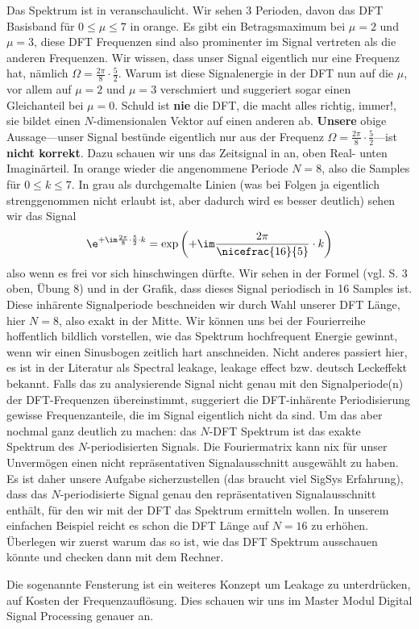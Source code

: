 \begin{Loesung}
%
%
Das Spektrum ist in  veranschaulicht. Wir sehen
3 Perioden, davon das DFT Basisband für $0\leq \mu \leq 7$ in orange.
Es gibt ein Betragsmaximum bei $\mu=2$ und $\mu=3$, diese DFT Frequenzen sind
also prominenter im Signal vertreten als die anderen Frequenzen.
%
Wir wissen, dass unser Signal eigentlich nur eine Frequenz hat, nämlich
$\Omega=\frac{2\pi}{8}\cdot\frac{5}{2}$.
Warum ist diese Signalenergie in der DFT nun auf die $\mu$, vor allem auf $\mu=2$ und
$\mu=3$  verschmiert und suggeriert sogar einen Gleichanteil bei $\mu=0$.
%
Schuld ist \textbf{nie} die DFT, die macht alles richtig, immer!, sie bildet
einen $N$-dimensionalen Vektor auf einen anderen ab.
%
\textbf{Unsere} obige Aussage---unser Signal bestünde eigentlich nur aus der Frequenz
$\Omega=\frac{2\pi}{8}\cdot\frac{5}{2}$---ist \textbf{nicht korrekt}.
Dazu schauen wir uns das Zeitsignal in  an, oben
Real- unten Imaginärteil. In orange wieder die angenommene Periode $N=8$, also
die Samples für $0 \leq k \leq 7$.
In grau als durchgemalte Linien (was bei Folgen ja eigentlich strenggenommen
nicht erlaubt ist, aber dadurch wird es besser deutlich) sehen wir das Signal
\begin{align}
\e^{+\im \frac{2\pi}{8} \cdot \frac{5}{2} \cdot k} =
\exp\left(+\im \frac{2\pi}{\nicefrac{16}{5}} \cdot k\right)
\end{align}
also wenn es frei vor sich hinschwingen dürfte.
Wir sehen in der Formel (vgl. S. 3 oben, Übung 8) und in der Grafik, dass
dieses Signal periodisch in 16 Samples ist.
%
Diese inhärente Signalperiode beschneiden wir durch Wahl unserer DFT Länge,
hier $N=8$, also exakt in der Mitte.
%
Wir können uns bei der Fourierreihe hoffentlich bildlich vorstellen, wie das
Spektrum hochfrequent Energie gewinnt, wenn wir einen Sinusbogen zeitlich
hart anschneiden.
%
Nicht anderes passiert hier, es ist in der Literatur als Spectral leakage,
leakage effect bzw. deutsch Leckeffekt bekannt.
%
Falls das zu analysierende Signal nicht genau mit den Signalperiode(n)
der DFT-Frequenzen übereinstimmt, suggeriert die DFT-inhärente Periodisierung
gewisse Frequenzanteile, die im Signal eigentlich nicht da sind.
%
Um das aber nochmal ganz deutlich zu machen: das $N$-DFT Spektrum ist das exakte
Spektrum des $N$-periodisierten Signals.
Die Fouriermatrix kann nix für unser Unvermögen einen nicht repräsentativen
Signalausschnitt ausgewählt zu haben.
%
Es ist daher unsere Aufgabe sicherzustellen (das braucht viel SigSys Erfahrung),
dass das $N$-periodisierte Signal genau den repräsentativen Signalausschnitt
enthält, für den wir mit der DFT das Spektrum ermitteln wollen.
%
In unserem einfachen Beispiel reicht es schon die DFT Länge auf $N=16$ zu erhöhen.
%
Überlegen wir zuerst warum das so ist, wie das DFT Spektrum ausschauen könnte
und checken dann mit dem Rechner.
%

Die sogenannte Fensterung ist ein weiteres Konzept um Leakage zu unterdrücken,
auf Kosten der Frequenzauflösung. Dies schauen wir uns im Master Modul
Digital Signal Processing genauer an.
%
\end{Loesung}

